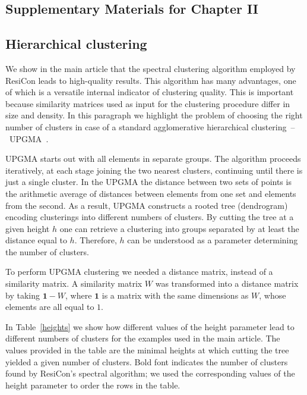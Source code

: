 \documentclass[a4paper,11pt,twoside]{book}%
\begin{document}
\begin{appendices}
  
\chapter{Supplementary Materials for Chapter II}



\section{Hierarchical clustering}
We show in the main article that the spectral clustering algorithm employed by ResiCon leads to high-quality results.
This algorithm has many advantages, one of which is a versatile internal indicator of clustering quality.
This is important because similarity matrices used as input for the clustering procedure differ in size and density.
In this paragraph we highlight the problem of choosing the right number of clusters in case of a standard agglomerative hierarchical clustering~--~UPGMA~\cite{Sokal1958}.

UPGMA starts out with all elements in separate groups.
The algorithm proceeds iteratively, at each stage joining the two nearest clusters, continuing until there is just a single cluster.
In the UPGMA the distance between two sets of points is the arithmetic average of distances between elements from one set and elements from the second.
As a result, UPGMA constructs a rooted tree (dendrogram) encoding clusterings into different numbers of clusters. %
By cutting the tree at a given height $h$ one can retrieve a clustering into groups separated by at least the distance equal to $h$.
Therefore, $h$ can be understood as a parameter determining the number of clusters.

To perform UPGMA clustering we needed a distance matrix, instead of a similarity matrix.
A similarity matrix $W$ was transformed into a distance matrix by taking $\mathbf{1}-W$, where $\mathbf{1}$ is a matrix with the same dimensions as $W$, whose elements are all equal to $1$.  

In Table~\ref{heights} we show how different values of the height parameter lead to different numbers of clusters for the examples used in the main article.
The values provided in the table are the minimal heights at which cutting the tree yielded a given number of clusters.
Bold font indicates the number of clusters found by ResiCon's spectral algorithm; we used the corresponding values of the height parameter to order the rows in the table.


\end{appendices}
\end{document}
